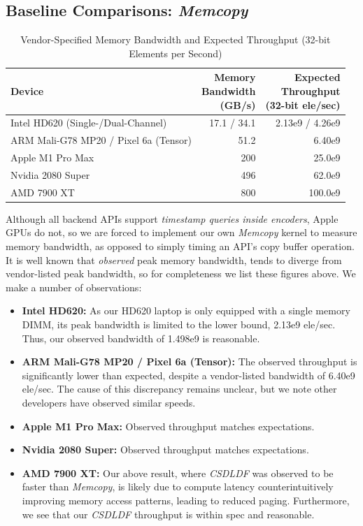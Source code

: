 \documentclass[sigconf]{acmart}
\begin{document}
\subsection{Baseline Comparisons: \emph{Memcopy}}
\label{sec:memcopy}
\begin{table}[h!]
  \small
  \centering
  \begin{tabular}{l r r}
    \toprule
    Device                                & \makecell{Memory                   \\ Bandwidth \\ (GB/s)} & \makecell{Expected \\ Throughput \\ (32-bit ele/sec)} \\
    \midrule
    Intel HD620 (Single-/Dual-Channel)    & 17.1 / 34.1      & 2.13e9 / 4.26e9 \\
    ARM Mali-G78 MP20 / Pixel 6a (Tensor) & 51.2             & 6.40e9          \\
    Apple M1 Pro Max                      & 200              & 25.0e9          \\
    Nvidia 2080 Super                     & 496              & 62.0e9          \\
    AMD 7900 XT                           & 800              & 100.0e9         \\
    \bottomrule
  \end{tabular}
  \caption{Vendor-Specified Memory Bandwidth and Expected Throughput (32-bit Elements per Second)}
  \label{tab:memory_bandwidth}
\end{table}
Although all backend APIs support \emph{timestamp queries inside encoders}, Apple GPUs do not, so we are forced to implement our own \emph{Memcopy} kernel to measure memory bandwidth, as opposed to simply timing an API's copy buffer operation. It is well known that \emph{observed} peak memory bandwidth, tends to diverge from vendor-listed peak bandwidth, so for completeness we list these figures above. We make a number of observations:
\begin{itemize}
  \item \textbf{Intel HD620:} As our HD620 laptop is only equipped with a single memory DIMM, its peak bandwidth is limited to the lower bound, 2.13e9 ele/sec. Thus, our observed bandwidth of 1.498e9 is reasonable.
  \item \textbf{ARM Mali-G78 MP20 / Pixel 6a (Tensor):} The observed throughput is significantly lower than expected, despite a vendor-listed bandwidth of 6.40e9 ele/sec. The cause of this discrepancy remains unclear, but we note other developers have observed similar speeds.
  \item \textbf{Apple M1 Pro Max:} Observed throughput matches expectations.
  \item \textbf{Nvidia 2080 Super:} Observed throughput matches expectations.
  \item \textbf{AMD 7900 XT:} Our above result, where \emph{CSDLDF} was observed to be faster than \emph{Memcopy}, is likely due to compute latency counterintuitively improving memory access patterns, leading to reduced paging. Furthermore, we see that our \emph{CSDLDF} throughput is within spec and reasonable.
\end{itemize}
\end{document}
